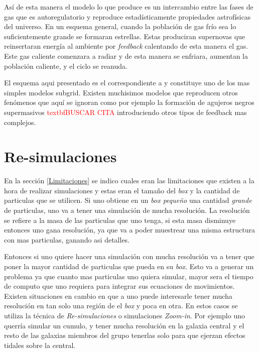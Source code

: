 As\'i de esta manera el modelo lo que produce es un intercambio entre las fases de gas que es autoregulatorio y reproduce estad\'isticamente propiedades astrof\'isicas del universo. En un esquema general, cuando la poblaci\'on de gas fr\'io sea lo suficientemente grande se formaran estrellas. Estas produciran supernovas que reinsertaran energ\'ia al ambiente por \textit{feedback} calentando de esta manera el gas. Este gas caliente comenzara a radiar y de esta manera se enfriara, aumentan la poblaci\'on caliente, y el ciclo se reanuda. 

El esquema aqui presentado es el correspondiente a \citet{Springel2003} y constituye uno de los mas simples modelos subgrid. Existen muchisimos modelos que reproducen otros fen\'omenos que aqu\'i se ignoran como por ejemplo la formaci\'on de agujeros negros supermasivos \textcolor{red}{textbf{BUSCAR CITA}} introduciendo otros tipos de feedback mas complejos. 

\section{Re-simulaciones }

En la secci\'on \ref{Limitaciones} se indico cuales eran las limitaciones que existen a la hora de realizar simulaciones y estas eran el tama\~no del \textit{box} y la cantidad de particulas que se utilicen. Si uno obtiene en un \textit{box peque\~no} una cantidad \textit{grande} de particulas, uno va a tener una simulaci\'on de mucha resoluci\'on. La resoluci\'on se refiere a la masa de las particulas que uno tenga, si esta masa disminuye entonces uno gana resoluci\'on, ya que va a poder muestrear una misma estructura con mas particulas, ganando asi detalles. 

Entonces si uno quiere hacer una simulaci\'on con mucha resoluci\'on va a tener que poner la mayor cantidad de particulas que pueda en su \textit{box}. Esto va a generar un problema ya que cuanto mas particulas uno quiera simular, mayor sera el tiempo de computo que uno requiera para integrar sus ecuaciones de movimientos. Existen situaciones en cambio en que a uno puede interesarle tener mucha resoluci\'on en tan solo una regi\'on de el \textit{box} y poca en otra. En estos casos se utiliza la t\'ecnica de \textit{Re-simulaciones} o simulaciones \textit{Zoom-in}. Por ejemplo uno querr\'ia simular un cumulo, y tener mucha resoluci\'on en la galaxia central y el resto de las galaxias miembros del grupo tenerlas solo para que ejerzan efectos tidales sobre la central. 

